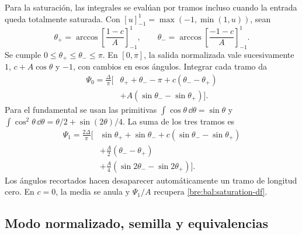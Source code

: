 Para la saturación, las integrales se evalúan por tramos incluso cuando
la entrada queda totalmente saturada. Con
\([u]_{-1}^{1}=\max(-1,\min(1,u))\), sean
\begin{equation}
 \theta_+=\arccos\left[\frac{1-c}{A}\right]_{-1}^{1},\qquad
 \theta_-=\arccos\left[\frac{-1-c}{A}\right]_{-1}^{1}.
 \label{bre:bal:bias-crossings}
\end{equation}
Se cumple \(0\leq\theta_+\leq\theta_-\leq\pi\). En
\([0,\pi]\), la salida normalizada vale sucesivamente
\(1\), \(c+A\cos\theta\) y \(-1\), con cambios en esos
ángulos. Integrar cada tramo da
\begin{equation}
 \begin{aligned}
 \Psi_0=\frac\Delta\pi\bigl[&\theta_++\theta_--\pi
       +c(\theta_--\theta_+)\\
       &+A(\sin\theta_--\sin\theta_+)\bigr].
 \end{aligned}
 \label{bre:bal:bias-sat-dc}
\end{equation}
Para el fundamental se usan las primitivas
\(\int\cos\theta\,\dd\theta=\sin\theta\) y
\(\int\cos^2\theta\,\dd\theta=\theta/2+\sin(2\theta)/4\).
La suma de los tres tramos es
\begin{equation}
 \begin{aligned}
 \Psi_1=\frac{2\Delta}\pi\bigl[&\sin\theta_++\sin\theta_-
       +c(\sin\theta_--\sin\theta_+)\\
       &+\tfrac A2(\theta_--\theta_+)\\
       &+\tfrac A4(\sin2\theta_--\sin2\theta_+)\bigr].
 \end{aligned}
 \label{bre:bal:bias-sat-first}
\end{equation}
Los ángulos recortados hacen desaparecer automáticamente un tramo de
longitud cero. En \(c=0\), la media se anula y
\(\Psi_1/A\) recupera \eqref{bre:bal:saturation-df}.

\subsection{Modo normalizado, semilla y equivalencias}
\label{bre:bal:modal}

